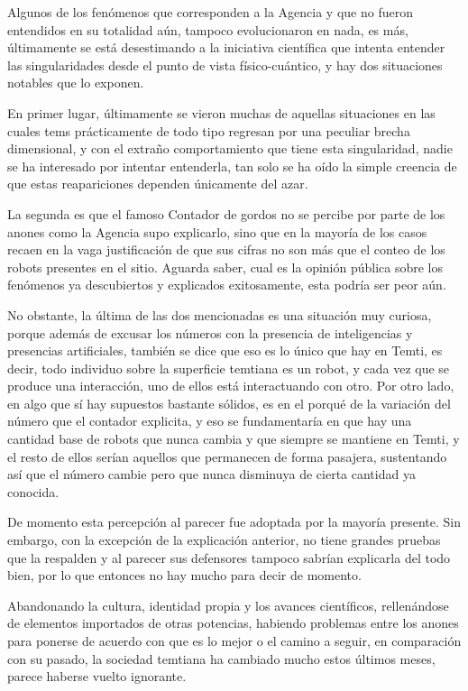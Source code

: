 \documentclass[
  spanish,
]{book}
\begin{document}
Algunos de los fenómenos que corresponden a la Agencia y que no fueron entendidos en su totalidad aún, tampoco evolucionaron en nada, es más, últimamente se está desestimando a la iniciativa científica que intenta entender las singularidades desde el punto de vista físico-cuántico, y hay dos situaciones notables que lo exponen.

En primer lugar, últimamente se vieron muchas de aquellas situaciones en las cuales tems prácticamente de todo tipo regresan por una peculiar brecha dimensional, y con el extraño comportamiento que tiene esta singularidad, nadie se ha interesado por intentar entenderla, tan solo se ha oído la simple creencia de que estas reapariciones dependen únicamente del azar.

La segunda es que el famoso Contador de gordos no se percibe por parte de los anones como la Agencia supo explicarlo, sino que en la mayoría de los casos recaen en la vaga justificación de que sus cifras no son más que el conteo de los robots presentes en el sitio. Aguarda saber, cual es la opinión pública sobre los fenómenos ya descubiertos y explicados exitosamente, esta podría ser peor aún.

No obstante, la última de las dos mencionadas es una situación muy curiosa, porque además de excusar los números con la presencia de inteligencias y presencias artificiales, también se dice que eso es lo único que hay en Temti, es decir, todo individuo sobre la superficie temtiana es un robot, y cada vez que se produce una interacción, uno de ellos está interactuando con otro. Por otro lado, en algo que sí hay supuestos bastante sólidos, es en el porqué de la variación del número que el contador explicita, y eso se fundamentaría en que hay una cantidad base de robots que nunca cambia y que siempre se mantiene en Temti, y el resto de ellos serían aquellos que permanecen de forma pasajera, sustentando así que el número cambie pero que nunca disminuya de cierta cantidad ya conocida.

De momento esta percepción al parecer fue adoptada por la mayoría presente. Sin embargo, con la excepción de la explicación anterior, no tiene grandes pruebas que la respalden y al parecer sus defensores tampoco sabrían explicarla del todo bien, por lo que entonces no hay mucho para decir de momento.

Abandonando la cultura, identidad propia y los avances científicos, rellenándose de elementos importados de otras potencias, habiendo problemas entre los anones para ponerse de acuerdo con que es lo mejor o el camino a seguir, en comparación con su pasado, la sociedad temtiana ha cambiado mucho estos últimos meses, parece haberse vuelto ignorante.
\end{document}
